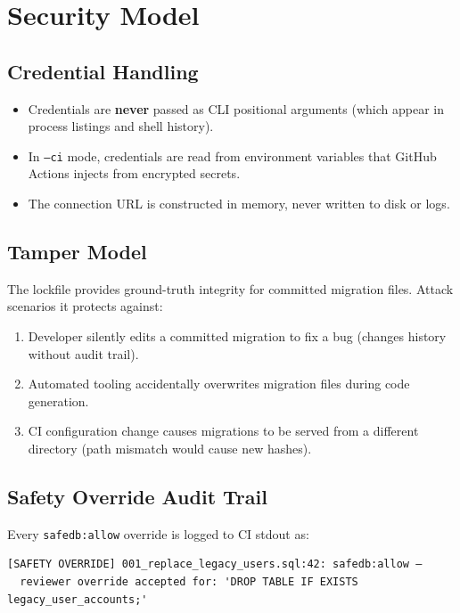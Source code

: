 \documentclass[12pt,a4paper]{report}
\begin{document}
\chapter{Security Model}

\section{Credential Handling}

\begin{itemize}
  \item Credentials are \textbf{never} passed as CLI positional arguments (which
        appear in process listings and shell history).
  \item In \texttt{--ci} mode, credentials are read from environment variables
        that GitHub Actions injects from encrypted secrets.
  \item The connection URL is constructed in memory, never written to disk or logs.
\end{itemize}

\section{Tamper Model}

The lockfile provides ground-truth integrity for committed migration files.
Attack scenarios it protects against:

\begin{enumerate}
  \item Developer silently edits a committed migration to fix a bug
        (changes history without audit trail).
  \item Automated tooling accidentally overwrites migration files during
        code generation.
  \item CI configuration change causes migrations to be served from a
        different directory (path mismatch would cause new hashes).
\end{enumerate}

\section{Safety Override Audit Trail}

Every \texttt{safedb:allow} override is logged to CI stdout as:

\begin{lstlisting}
[SAFETY OVERRIDE] 001_replace_legacy_users.sql:42: safedb:allow —
  reviewer override accepted for: 'DROP TABLE IF EXISTS legacy_user_accounts;'
\end{lstlisting}
\end{document}
